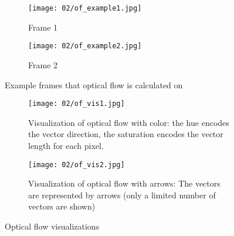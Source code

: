 \begin{figure}
\centering
    \begin{subfigure}[t]{0.5\textwidth}            
            \centering
            \texttt{[image: 02/of\_example1.jpg]}
            \caption{Frame 1}
    \end{subfigure}%
    \begin{subfigure}[t]{0.5\textwidth}
            \centering
            \texttt{[image: 02/of\_example2.jpg]}
            \caption{Frame 2}
    \end{subfigure}
    \caption[Optical flow example]{Example frames that optical flow is calculated on}\label{fig:of_example_bike}

    \quad
    \begin{subfigure}[t]{0.5\textwidth}            
            \centering
            \texttt{[image: 02/of\_vis1.jpg]}
            \caption{Visualization of optical flow with color: the hue encodes the vector direction, the saturation encodes the vector length for each pixel.}
    \end{subfigure}%
    \begin{subfigure}[t]{0.5\textwidth}
            \centering
            \texttt{[image: 02/of\_vis2.jpg]}
            \caption{Visualization of optical flow with arrows: The vectors are represented by arrows (only a limited number of vectors are shown)}
    \end{subfigure}
    \caption[Optical flow visualizations]{Optical flow visualizations}\label{fig:of_vis}
\end{figure}

